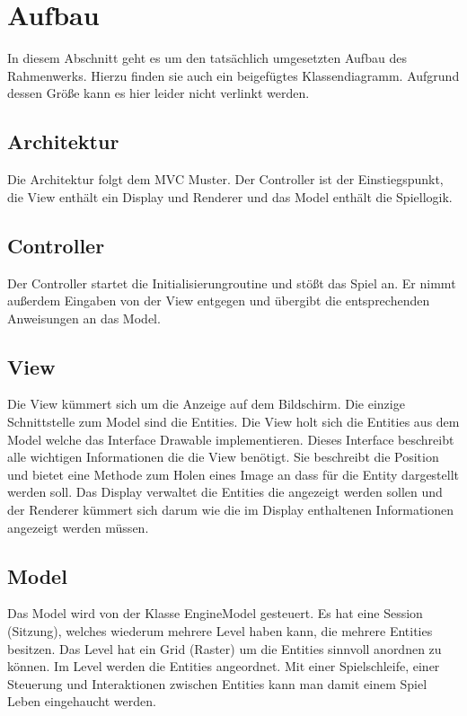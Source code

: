 \documentclass[a4paper, 11pt]{article}
\begin{document}
\section{Aufbau}

In diesem Abschnitt geht es um den tatsächlich umgesetzten Aufbau des Rahmenwerks. Hierzu finden sie auch ein beigefügtes Klassendiagramm. Aufgrund dessen Größe kann es hier leider nicht verlinkt werden.

\subsection{Architektur}

Die Architektur folgt dem MVC Muster. Der Controller ist der Einstiegspunkt, die View enthält ein Display und Renderer und das Model enthält die Spiellogik.

\subsection{Controller}

Der Controller startet die Initialisierungroutine und stößt das Spiel an. Er nimmt außerdem Eingaben von der View entgegen und übergibt die entsprechenden Anweisungen an das Model.

\subsection{View}

Die View kümmert sich um die Anzeige auf dem Bildschirm. Die einzige Schnittstelle zum Model sind die Entities. Die View holt sich die Entities aus dem Model welche das Interface Drawable implementieren. Dieses Interface beschreibt alle wichtigen Informationen die die View benötigt. Sie beschreibt die Position und bietet eine Methode zum Holen eines Image an dass für die Entity dargestellt werden soll. Das Display verwaltet die Entities die angezeigt werden sollen und der Renderer kümmert sich darum wie die im Display enthaltenen Informationen angezeigt werden müssen. 

\subsection{Model}

Das Model wird von der Klasse EngineModel gesteuert. Es hat eine Session (Sitzung), welches wiederum mehrere Level haben kann, die mehrere Entities besitzen. Das Level hat ein Grid (Raster) um die Entities sinnvoll anordnen zu können. Im Level werden die Entities angeordnet. Mit einer Spielschleife, einer Steuerung und Interaktionen zwischen Entities kann man damit einem Spiel Leben eingehaucht werden.
\end{document}
